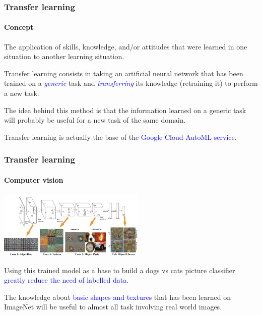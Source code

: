 \documentclass[10pt]{beamer}
\begin{document}
\begin{frame}

  \frametitle{Transfer learning}

  \framesubtitle{Concept}

  \begin{displayquote}[Perkins, 1992]
  The application of skills, knowledge, and/or attitudes that were
  learned in one situation to another learning situation.
  \end{displayquote}

  \bigskip

  Transfer learning consists in taking an artificial neural network
  that has been trained on a \textcolor{blue}{\emph{generic}} task and
  \textcolor{blue}{\emph{transferring}} its knowledge (retraining it)
  to perform a new task.

  \bigskip

  The idea behind this method is that the information learned on a
  generic task will probably be useful for a new task of the same
  domain.

  \bigskip

  Transfer learning is actually the base of the
  \textcolor{blue}{Google Cloud AutoML service}.

\end{frame}

\begin{frame}

  \frametitle{Transfer learning}

  \framesubtitle{Computer vision}

  \begin{center}
    \includegraphics[width = 7cm]{images/alexnet_architecture.png}
  \end{center}

  Using this trained model as a base to build a dogs vs cats picture
  classifier \textcolor{blue}{greatly reduce the need of labelled
    data}.

  \bigskip

  The knowledge about \textcolor{blue}{basic shapes and textures} that
  has been learned on ImageNet will be useful to almost all task
  involving real world images.

\end{frame}
\end{document}
